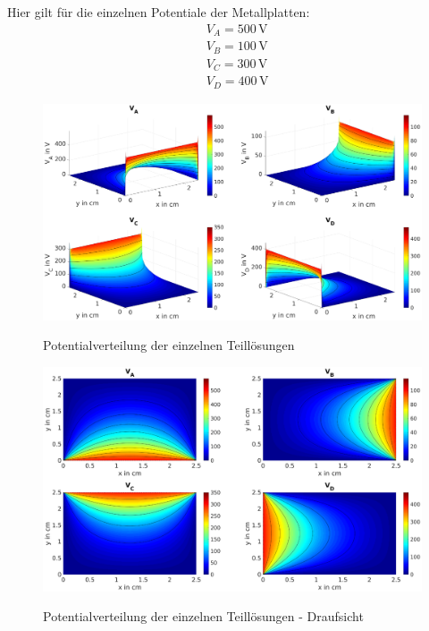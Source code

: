 Hier gilt für die einzelnen Potentiale der Metallplatten:
\begin{align*}
	&V_A = 500\,\mathrm{V} \\
	&V_B = 100\,\mathrm{V} \\
	&V_C = 300\,\mathrm{V} \\
	&V_D = 400\,\mathrm{V}
\end{align*}

\begin{figure}[H]
  \centering
  		\includegraphics[width=1.0\textwidth]{pics/Bsp_1_analytical_figures/TaskC_fig_1.eps}
  \label{fig:Ana:TaskC:Individual}
  \caption{Potentialverteilung der einzelnen Teillösungen}
\end{figure}

\begin{figure}[H]
  \centering
  		\includegraphics[width=1.0\textwidth]{pics/Bsp_1_analytical_figures/TaskC_fig_3.eps}
  \label{fig:Ana:TaskC:IndividualRot}
  \caption{Potentialverteilung der einzelnen Teillösungen - Draufsicht}
\end{figure}


